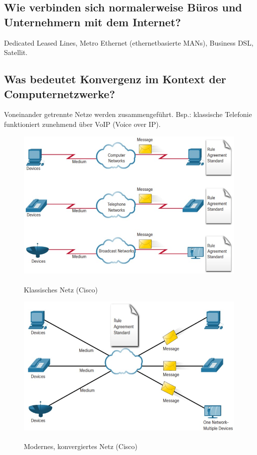 \subsection*{Wie verbinden sich normalerweise Büros und Unternehmern mit dem Internet?}
Dedicated Leased Lines, Metro Ethernet (ethernetbasierte MANs), Business DSL, Satellit.

\subsection*{Was bedeutet Konvergenz im Kontext der Computernetzwerke?}
Voneinander getrennte Netze werden zusammengeführt. Bsp.: klassische Telefonie funktioniert zunehmend über VoIP (Voice over IP).

\begin{figure}[H]
    \begin{center}
    \label{pic:converging_classic}
    \includegraphics[width=.6\textwidth]{images/converging_network_classic.jpg}
    \caption{Klassisches Netz (\textsuperscript{\textcopyright}Cisco)}
    \end{center}
\end{figure}
\begin{figure}[H]
    \begin{center}
    \label{pic:converging_modern}
    \includegraphics[width=.6\textwidth]{images/converging_network_modern.jpg}
    \caption{Modernes, konvergiertes Netz (\textsuperscript{\textcopyright}Cisco)}
    \end{center}
\end{figure}

